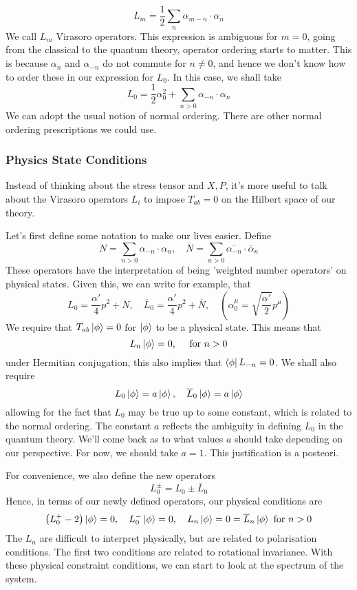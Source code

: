 \documentclass[11pt, oneside]{article}   	%
\theoremstyle{slanted}
\begin{document}
\[
 L _ m  = \frac{1}{2 } \sum_ n \alpha _{ m - n } \cdot  \alpha _ n 
\] 
We call $ L _ m $ Virasoro 
operators. This expression is 
ambiguous for $ m   = 0 $, 
going from the classical to the quantum theory, 
operator ordering starts to matter.
 This is because $ \alpha _ n $ and $ \alpha _{  - n  } $
 do not commute for $ n \neq 0 $, and hence
 we don't know how to order these in our expression for $ L _ 0 $. 
 In this case, we shall take 
 \[
   L _ 0  = \frac{1}{2 } \alpha _ 0 ^ 2 + \sum _{ n > 0  } \alpha 
   _{ -n  } \cdot  \alpha _ n 
 \] 
 We can adopt the usual notion of 
 normal ordering. 
 There are other normal ordering prescriptions 
 we could use.

 \subsubsection{Physics State Conditions}
 Instead of thinking about 
 the stress tensor and $ X  , P $, it's
 more useful to talk about 
 the Virasoro operators $ L _ i $ to 
 impose $ T _{ ab }  =0 $ on the Hilbert space 
 of our theory. 

 Let's first define 
 some notation to make our lives easier. 
 Define 
 \[
  N  = \sum _{ n > 0 } \alpha _{  -n  } \cdot \alpha _ n ,\quad  
  \overline{ N }  = \sum _{ n > 0 } \overline{\alpha _{ - n }}  \cdot  
  \overline{\alpha} _ n 
 \] These operators have the interpretation of 
 being 'weighted number operators' on physical states. 
 Given this, 
 we can write for example, that
 \[
  L_0 = \frac{\alpha ' }{ 4 } p ^2 + N , \quad  
  \overline{ L } _ 0   = \frac{\alpha '  }{ 4 } p ^ 2 + \overline{ N } , 
  \quad \left( \alpha _ 0 ^ \mu  = \sqrt{ \frac{\alpha '  }{ 2 } }  p ^ \mu  \right) 
 \] We require
 that $ T_{ ab   } \ket{ \phi }  = 0 $ 
 for $ \ket{ \phi } $ to be a physical state. 
 This means that 
 \[
  L _ n \ket{ \phi }   = 0, \quad \text{ for } n > 0 
 \] under Hermitian conjugation, this also implies 
 that $ \bra{ \phi } L _{  - n }  = 0  $. 
 We shall also require 
 \[
  L _ 0 \ket{ \phi }  = a \ket{ \phi } , \quad \overline{ L } _ 0 
  \ket{ \phi }  = a \ket{ \phi } 
 \] allowing for the fact that $ L _ 0 $ 
 may be true up to some constant, which is related to 
 the normal ordering. The constant $ a $ reflects 
 the ambiguity in defining $ L_0 $ in the quantum theory. 
We'll come back as to what values $ a $ should take 
depending on our perspective. For 
now, we should take $ a = 1 $. 
This justification is a posteori. 

For convenience, we also define the new operators 
\[
 L _ 0 ^{ \pm }  = L _ 0 \pm \overline{ L } _ 0 
\] Hence, in terms of our newly defined 
operators, our physical 
conditions are 
\[
 \left( L_0 ^{ +  }  - 2 \right)  \ket{ \phi }  =0, \quad 
 L_ 0 ^ - \ket{ \phi }  = 0 , \quad L_ n \ket{ \phi }  = 0 
  = \overline{ L } _ n \ket{ \phi } \text{ for  } n > 0 
\] The $ L _ n $ are difficult to interpret physically, 
but are related to polarisation 
conditions. The first two conditions 
are related to rotational invariance. 
With these physical constraint conditions, we can start to look at the
spectrum of the system.  
\end{document}
